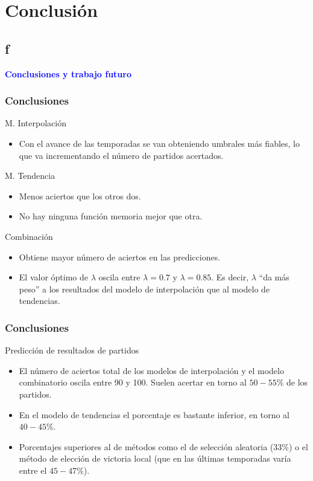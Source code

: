 \documentclass{beamer}
\begin{document}
	\section{Conclusión}
	\subsection{f}
	\begin{frame}
		\begin{center}
			\Huge\textbf{\textsf{\textcolor{blue}{Conclusiones y trabajo futuro}}}
		\end{center}
	\end{frame}	
		
	\begin{frame}
		\frametitle{Conclusiones}
		\begin{block}{M. Interpolación}
			\begin{itemize}
				\item Con el avance de las temporadas se van obteniendo umbrales más fiables, lo que va incrementando el número de partidos acertados.
			\end{itemize}		
		\end{block}			
		\begin{block}{M. Tendencia}
			\begin{itemize}
				\item Menos aciertos que los otros dos.
				\item No hay ninguna función memoria mejor que otra. 	
			\end{itemize}		
		\end{block}
		\begin{block}{Combinación}
			\begin{itemize}
			\item Obtiene mayor número de aciertos en las predicciones.
			\item El valor óptimo de $\lambda$ oscila entre $\lambda=0.7$ y $\lambda=0.85$. Es decir, $\lambda$ ``da más peso'' a los resultados del modelo de interpolación que al modelo de tendencias.	
			\end{itemize}		
		\end{block}		
	\end{frame}
	
	\begin{frame}
		\frametitle{Conclusiones}
		\begin{block}{Predicción de resultados de partidos}
			\begin{itemize}
				\item El número de aciertos total de los modelos de interpolación y el modelo combinatorio oscila entre 90 y 100. Suelen acertar en torno al $50-55\%$ de los partidos. 
				\item En el modelo de tendencias el porcentaje es bastante inferior, en torno al $40-45\%$. 
				\item Porcentajes superiores al de métodos como el de selección aleatoria ($33\%$) o el método de elección de victoria local (que en las últimas temporadas varía entre el $45-47\%$).
			\end{itemize}		
		\end{block}				
	\end{frame}	
\end{document}
